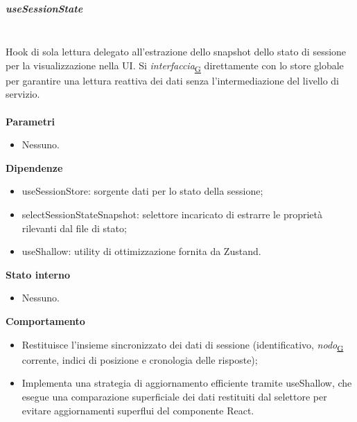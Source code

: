 \documentclass[a4paper,12pt]{article}
\begin{document}
                \subparagraph{useSessionState}\mbox{}\\
                Hook di sola lettura delegato all'estrazione dello snapshot dello stato di sessione per la visualizzazione nella UI. Si \textit{interfaccia}\textsubscript{\href{https://atlasteam9.github.io/Atlas/glossario.html\#Interfaccia}{G}} direttamente con lo store globale per garantire una lettura reattiva dei dati senza l'intermediazione del livello di servizio.\\\\
                \textbf{Parametri}
                \begin{itemize}
                    \item Nessuno.
                \end{itemize}
                \textbf{Dipendenze}
                \begin{itemize}
                    \item {\ttfamily useSessionStore}: sorgente dati per lo stato della sessione;
                    \item {\ttfamily selectSessionStateSnapshot}: selettore incaricato di estrarre le proprietà rilevanti dal file di stato;
                    \item {\ttfamily useShallow}: utility di ottimizzazione fornita da Zustand.
                \end{itemize}
                \textbf{Stato interno}
                \begin{itemize}
                    \item Nessuno.
                \end{itemize}
                \textbf{Comportamento}
                \begin{itemize}
                    \item Restituisce l'insieme sincronizzato dei dati di sessione (identificativo, \textit{nodo}\textsubscript{\href{https://atlasteam9.github.io/Atlas/glossario.html\#Nodo}{G}} corrente, indici di posizione e cronologia delle risposte);
                    \item Implementa una strategia di aggiornamento efficiente tramite {\ttfamily useShallow}, che esegue una comparazione superficiale dei dati restituiti dal selettore per evitare aggiornamenti superflui del componente React.
                \end{itemize}
                
\end{document}
